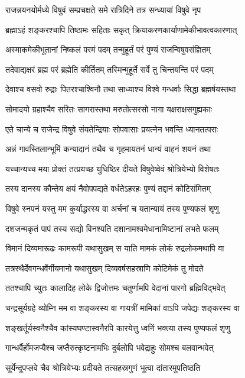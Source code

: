 \twolineshloka
{राजन्नयनयोर्मध्ये विषुवं सम्प्रचक्षते}
{समे रात्रिदिने तत्र सन्ध्यायां विषुवे नृप}


\twolineshloka
{ब्रह्माऽहं शङ्करश्चापि तिष्ठामः सहिताः सकृत्}
{क्रियाकरणकार्याणामेकीभावत्वकारणात्}


\twolineshloka
{अस्माकमेकीभूतानां निष्कलं परमं पदम्}
{तन्मुहूर्तं परं पुण्यं राजन्विषुवसंज्ञितम्}


\twolineshloka
{तदेवाद्यक्षरं ब्रह्म परं ब्रह्मेति कीर्तितम्}
{तस्मिन्मुहूर्ते सर्वे तु चिन्तयन्ति परं पदम्}


\twolineshloka
{देवाश्च वसवो रुद्राः पितरश्चाश्विनौ तथा}
{साध्याश्च विश्वे गन्धर्वाः सिद्धा ब्रह्मर्षयस्तथा}


\twolineshloka
{सोमादयो ग्रहाश्चैव सरितः सागरास्तथा}
{मरुतोत्सरसो नागा यक्षराक्षसगुह्यकाः}


\twolineshloka
{एते चान्ये च राजेन्द्र विषुवे संयतेन्द्रियाः}
{सोपवासाः प्रयत्नेन भवन्ति ध्यानतत्पराः}


\threelineshloka
{अन्नं गावस्तिलान्भूमिं कन्यादानं तथैव च}
{गृहमायतनं धान्यं वाहनं शयनं तथा}
{}


\twolineshloka
{यच्चान्यच्च मया प्रोक्तं तत्प्रयच्छ युधिष्ठिर}
{दीयते विषुवेष्वेवं श्रोत्रियेभ्यो विशेषतः}


\twolineshloka
{तस्य दानस्य कौन्तेय क्षयं नैवोपपद्यते}
{वर्धतेऽहरहः पुण्यं तद्दानं कोटिसंमितम्}


\twolineshloka
{विषुवे स्नपनं यस्तु मम कुर्याद्धरस्य वा}
{अर्चनां च यतान्यायं तस्य पुण्यफलं शृणु}


\twolineshloka
{दशजन्मकृतं पापं तस्य सद्यो विनश्यति}
{दशानामश्वमेधानामिष्टानां लभते फलम्}


\twolineshloka
{विमानं दिव्यमारूढः कामरूपी यथासुखम्}
{स याति मामकं लोकं रुद्रलोकमथापि वा}


\twolineshloka
{तत्रस्थैर्देवगन्धर्वेर्गीयमानो यथासुखम्}
{दिव्यवर्षसहस्राणि कोटिमेकं तु मोदते}


\twolineshloka
{ततश्चापि च्युतः कालादिह लोके द्विजोत्तमः}
{चतुर्णामपि वेदानां पारगो ब्रह्मिविद्भवेत्}


\twolineshloka
{चन्द्रसूर्यग्रहे व्योम्नि मम वा शङ्करस्य वा}
{गायत्रीं मामिकां वाऽपि जपेद्यः शङ्करस्य वा}


\twolineshloka
{शङ्खर्तूर्यस्वनैश्चैव कांस्यघण्टास्वनैरपि}
{कारयेत्तु ध्वनिं भक्त्या तस्य पुण्यफलं शृणु}


\twolineshloka
{गान्धर्वैर्होमजप्यैश्च जप्तैरुत्कृष्टनामभिः}
{दुर्बलोपि भवेद्राहुः सोमश्च बलवान्भवेत्}


\twolineshloka
{सूर्येन्दूपप्लवे चैव श्रोत्रियेभ्यः प्रदीयते}
{तत्सहस्रगुणं भूत्वा दांतारमुपतिष्ठति}



